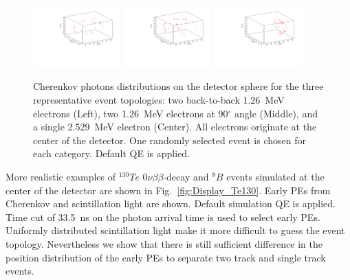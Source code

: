 \documentclass[12pt,twoside,letterpaper]{article}
\newcommand{\vbb}{0\nu\beta\beta}
\newcommand{\Te}{^{130}Te}
\newcommand{\B}{^{8}B}
\begin{document}
\begin{figure}[htb]
\centering
\includegraphics[angle=0,width=0.3\textwidth]{plots/hDisplay_topology180_2p529MeVTot}
\includegraphics[angle=0,width=0.3\textwidth]{plots/hDisplay_topology90_2p529MeVTot}
\includegraphics[angle=0,width=0.3\textwidth]{plots/hDisplay_1el_2p529MeV}
\caption{Cherenkov photons distributions on the detector sphere for the three representative event topologies: two back-to-back 1.26~MeV electrons (Left), two 1.26~MeV electrons at 90$^{\circ}$ angle (Middle), and a single 2.529~MeV electron (Center).  All electrons originate at the center of the detector. One randomly selected event is chosen for each category. Default QE is applied.}
\label{fig:Display_top_2p5MeV}
\end{figure}

More realistic examples of $\Te$ $\vbb$-decay and $\B$ events simulated at the center of the detector are shown in Fig.~\ref{fig:Display_Te130}. Early PEs from Cherenkov and scintillation light are shown. Default simulation QE is applied. Time cut of 33.5~ns on the photon arrival time is used to select early PEs. Uniformly distributed scintillation light make it more difficult to guess the event topology. Nevertheless we show that there is still sufficient difference in the position distribution of the early PEs to separate two track and single track events.
\end{document}
